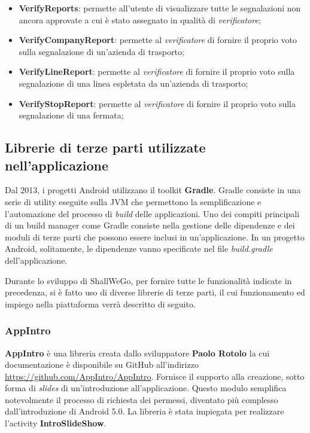 \begin{itemize}
                \item \textbf{VerifyReports}: permette all'utente di visualizzare tutte le segnalazioni non ancora approvate a cui è stato assegnato in qualità di \textit{verificatore};
                \item \textbf{VerifyCompanyReport}: permette al \textit{verificatore} di fornire il proprio voto sulla segnalazione di un'azienda di trasporto;
                \item \textbf{VerifyLineReport}: permette al \textit{verificatore} di fornire il proprio voto sulla segnalazione di una linea espletata da un'azienda di trasporto;
                \item \textbf{VerifyStopReport}: permette al \textit{verificatore} di fornire il proprio voto sulla segnalazione di una fermata;
            \end{itemize}
        
            \subsection{Librerie di terze parti utilizzate nell'applicazione}
                Dal 2013, i progetti Android utilizzano il toolkit \textbf{Gradle}. Gradle consiste in una serie di utility eseguite sulla JVM che permettono la semplificazione e l'automazione del processo di \textit{build} delle applicazioni. Uno dei compiti principali di un build manager come Gradle consiste nella gestione delle dipendenze e dei moduli di terze parti che possono essere inclusi in un'applicazione. In un progetto Android, solitamente, le dipendenze vanno specificate nel file \textit{build.gradle} dell'applicazione.

                Durante lo sviluppo di ShallWeGo, per fornire tutte le funzionalità indicate in precedenza, si è fatto uso di diverse librerie di terze parti, il cui funzionamento ed impiego nella piattaforma verrà descritto di seguito.

                \subsubsection{AppIntro}
                    \textbf{AppIntro} è una libreria creata dallo sviluppatore \textbf{Paolo Rotolo} la cui documentazione è disponibile su GitHub all'indirizzo \url{https://github.com/AppIntro/AppIntro}. Fornisce il supporto alla creazione, sotto forma di \textit{slides} di un'introduzione all'applicazione. Questo modulo semplifica notevolmente il processo di richiesta dei permessi, diventato più complesso dall'introduzione di Android 5.0.
                    La libreria è stata impiegata per realizzare l'activity \textbf{IntroSlideShow}.

